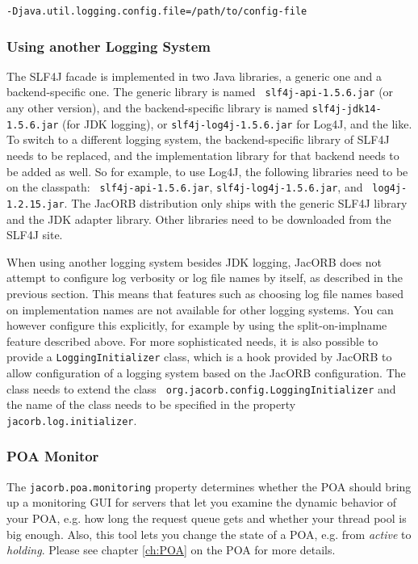 {{\begin{verbatim}
-Djava.util.logging.config.file=/path/to/config-file
\end{verbatim}

\subsubsection{Using another Logging System}

The SLF4J facade is implemented in two Java libraries, a generic one
and a backend-specific one.  The generic library is named {\tt
  slf4j-api-1.5.6.jar} (or any other version), and the
backend-specific library is named {\tt slf4j-jdk14-1.5.6.jar} (for JDK
logging), or {\tt slf4j-log4j-1.5.6.jar} for Log4J, and the like.  To
switch to a different logging system, the backend-specific library of
SLF4J needs to be replaced, and the implementation library for that
backend needs to be added as well.  So for example, to use Log4J, the
following libraries need to be on the classpath: {\tt
  slf4j-api-1.5.6.jar}, {\tt slf4j-log4j-1.5.6.jar}, and {\tt
  log4j-1.2.15.jar}.  The JacORB distribution only ships with the
generic SLF4J library and the JDK adapter library.  Other libraries
need to be downloaded from the SLF4J site.

When using another logging system besides JDK logging, JacORB does not
attempt to configure log verbosity or log file names by itself, as
described in the previous section.  This means that features such as
choosing log file names based on implementation names are not
available for other logging systems.  You can however configure this
explicitly, for example by using the split-on-implname feature
described above.  For more sophisticated needs, it is also possible to
provide a {\tt LoggingInitializer} class, which is a hook provided by
JacORB to allow configuration of a logging system based on the JacORB
configuration.  The class needs to extend the class {\tt
  org.jacorb.config.LoggingInitializer} and the name of the class
needs to be specified in the property {\tt jacorb.log.initializer}.

\subsubsection{POA Monitor}

The  {\tt jacorb.poa.monitoring} property  determines whether  the POA
should bring up a monitoring GUI  for servers that let you examine the
dynamic behavior of  your POA, e.g.  how long  the request queue gets
and whether your thread pool is  big enough.  Also, this tool lets you
change the  state of a POA,  e.g. from {\it active}  to {\it holding}.
Please see chapter \ref{ch:POA} on the POA for more details.

}}
